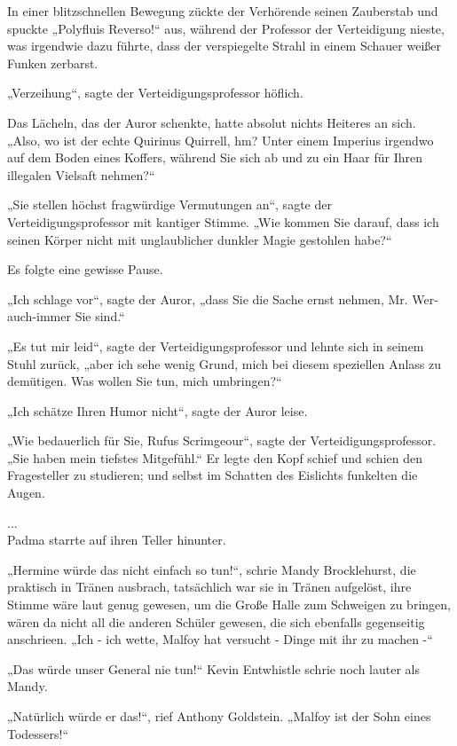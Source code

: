 {In einer blitzschnellen Bewegung zückte der Verhörende seinen Zauberstab und spuckte „Polyfluis Reverso!“ aus, während der Professor der Verteidigung nieste, was irgendwie dazu führte, dass der verspiegelte Strahl in einem Schauer weißer Funken zerbarst.

„Verzeihung“, sagte der Verteidigungsprofessor höflich.

Das Lächeln, das der Auror schenkte, hatte absolut nichts Heiteres an sich.\\ „Also, wo ist der echte Quirinus Quirrell, hm? Unter einem Imperius irgendwo auf dem Boden eines Koffers, während Sie sich ab und zu ein Haar für Ihren illegalen Vielsaft nehmen?“

„Sie stellen höchst fragwürdige Vermutungen an“, sagte der Verteidigungsprofessor mit kantiger Stimme. „Wie kommen Sie darauf, dass ich seinen Körper nicht mit unglaublicher dunkler Magie gestohlen habe?“

Es folgte eine gewisse Pause.

„Ich schlage vor“, sagte der Auror, „dass Sie die Sache ernst nehmen, Mr. Wer-auch-immer Sie sind.“

„Es tut mir leid“, sagte der Verteidigungsprofessor und lehnte sich in seinem Stuhl zurück, „aber ich sehe wenig Grund, mich bei diesem speziellen Anlass zu demütigen. Was wollen Sie tun, mich umbringen?“

„Ich schätze Ihren Humor nicht“, sagte der Auror leise.

„Wie bedauerlich für Sie, Rufus Scrimgeour“, sagte der Verteidigungsprofessor. „Sie haben mein tiefstes Mitgefühl.“ Er legte den Kopf schief und schien den Fragesteller zu studieren; und selbst im Schatten des Eislichts funkelten die Augen.

...\\ Padma starrte auf ihren Teller hinunter.

„Hermine würde das nicht einfach so tun!“, schrie Mandy Brocklehurst, die praktisch in Tränen ausbrach, tatsächlich war sie in Tränen aufgelöst, ihre Stimme wäre laut genug gewesen, um die Große Halle zum Schweigen zu bringen, wären da nicht all die anderen Schüler gewesen, die sich ebenfalls gegenseitig anschrieen. „Ich - ich wette, Malfoy hat versucht - Dinge mit ihr zu machen -“

„Das würde unser General nie tun!“ Kevin Entwhistle schrie noch lauter als Mandy.

„Natürlich würde er das!“, rief Anthony Goldstein. „Malfoy ist der Sohn eines Todessers!“

}
